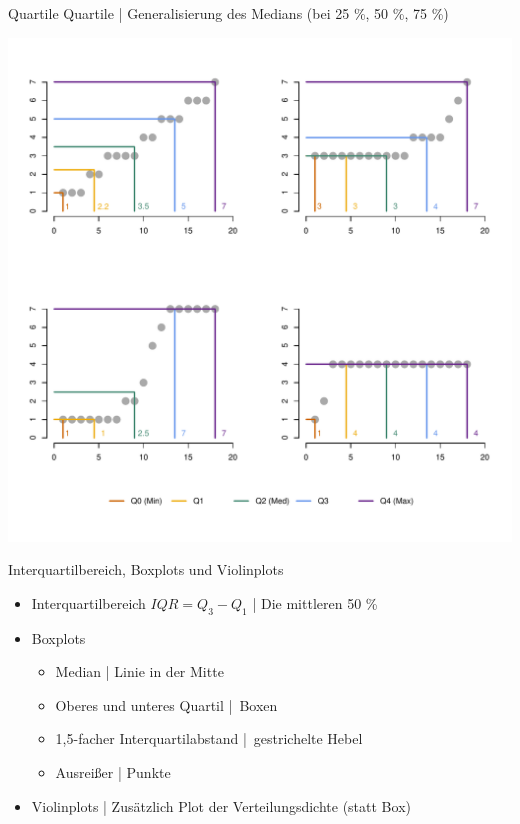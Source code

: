\begin{frame}
  {Quartile}
  \alert{Quartile} | Generalisierung des Medians (bei 25 \%, 50 \%, 75 \%)\\
  \begin{center}
    \includegraphics[height=0.85\textheight]{RVorlesung/fourquartiles}
  \end{center}
\end{frame}


\begin{frame}
  {Interquartilbereich, Boxplots und Violinplots}
  \begin{itemize}[<+->]
    \item Interquartilbereich \alert{$IQR = Q_3-Q_1$} | Die mittleren 50 \%
     \Zeile 
    \item Boxplots
      \Viertelzeile
      \begin{itemize}[<+->]
        \item \alert{Median} | Linie in der Mitte
        \item \alert{Oberes und unteres Quartil} | Boxen
        \item \alert{1,5-facher Interquartilabstand} | gestrichelte Hebel
        \item \alert{Ausreißer} | Punkte
      \end{itemize}
      \Halbzeile
    \item Violinplots | Zusätzlich Plot der Verteilungsdichte (statt Box)
  \end{itemize}
\end{frame}


